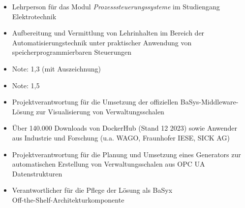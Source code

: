 \documentclass[10pt,a4paper,ragged2e,withhyper]{altacv}
\begin{document}
\begin{paracol}{2}
            \begin{itemize}
                \item Lehrperson für das Modul \textit{Prozesssteuerungssysteme} im Studiengang Elektrotechnik
                \item Aufbereitung und Vermittlung von Lehrinhalten im Bereich der Automatisierungstechnik unter praktischer Anwendung von speicherprogrammierbaren Steuerungen
            \end{itemize}
        
            \begin{itemize}
                \item Note: 1,3 (mit Auszeichnung)
            \end{itemize}
            \divider
            
            \begin{itemize}
                \item Note: 1,5
            \end{itemize}
        
            \begin{itemize}
                \item Projektverantwortung für die Umsetzung der offiziellen BaSys-Middleware-Lösung zur Visualisierung von Verwaltungsschalen
                \item Über 140.000 Downloads von DockerHub (Stand 12 2023) sowie Anwender aus Industrie und Forschung (u.a. WAGO, Fraunhofer IESE, SICK AG)
            \end{itemize}
            \divider
            
            \begin{itemize}
                \item Projektverantwortung für die Planung und Umsetzung eines Generators zur automatischen Erstellung von Verwaltungsschalen aus OPC UA Datenstrukturen
                \item Verantwortlicher für die Pflege der Lösung als BaSyx\\ Off-the-Shelf-Architekturkomponente
            \end{itemize}


\end{paracol}
\end{document}
